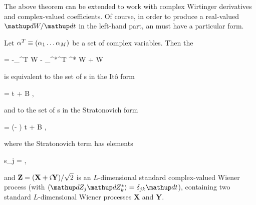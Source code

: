 The above theorem can be extended to work with complex Wirtinger derivatives and complex-valued coefficients.
Of course, in order to produce a real-valued $\upd W/\upd t$ in the left-hand part, an  must have a particular form.

\begin{theorem}
\label{thm:fpe-sde:corr:fpe-sde-complex}
	Let $\mathbf{\alpha}^T \equiv (\alpha_1 \ldots \alpha_M)$ be a set of complex variables.
	Then the 
	\begin{eqn*}
		= -\vcwd_{\balpha}^T \avec W - \vcwd_{\balpha^*}^T \avec^* W
		+  W
	\end{eqn*}
	is equivalent to the set of s in the It\^o form
	\begin{eqn*}
		\upd\balpha = \avec \upd t + B \upd\Zvec,
	\end{eqn*}
	and to the set of s in the Stratonovich form
	\begin{eqn*}
		\upd\balpha = (\avec - \svec) \upd t + B \upd\Zvec,
	\end{eqn*}
	where the Stratonovich term has elements
	\begin{eqn*}
		s_j =  \Trace{ B^H \vcwd_{\balpha^*} \evec_j^T B },
	\end{eqn*}
	and $\mathbf{Z} = (\mathbf{X} + i\mathbf{Y}) / \sqrt{2}$ is an $L$-dimensional standard complex-valued Wiener process (with $\langle \upd Z_j \upd Z_k^* \rangle = \delta_{jk} \upd t$), containing two standard $L$-dimensional Wiener processes $\mathbf{X}$ and $\mathbf{Y}$.
\end{theorem}
